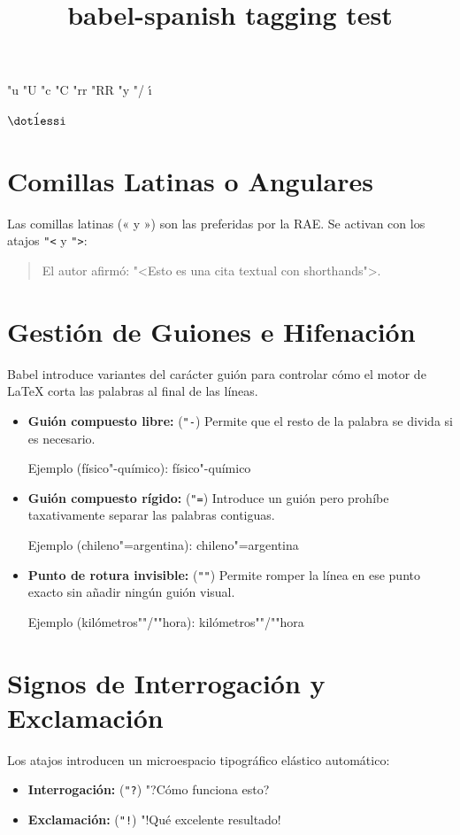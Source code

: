 \documentclass{article}
\title{babel-spanish tagging test}
\begin{document}
"u "U "c "C "rr "RR "y "/ \'{\i}

$\acute{\dotlessi}$

\section{Comillas Latinas o Angulares}
Las comillas latinas (« y ») son las preferidas por la RAE. Se activan con los
atajos \verb+"<+ y \verb+">+:

\begin{quotation}
El autor afirmó: "<Esto es una cita textual con shorthands">.
\end{quotation}

\section{Gestión de Guiones e Hifenación}
Babel introduce variantes del carácter guión para controlar cómo el motor de
\LaTeX{} corta las palabras al final de las líneas.

\begin{itemize}
    \item \textbf{Guión compuesto libre:}  (\verb+"-+) Permite que el resto
    de la palabra se divida si es necesario. \par
    Ejemplo (físico"-químico): físico"-químico

    \item \textbf{Guión compuesto rígido:} (\verb+"=+) Introduce un guión
    pero prohíbe taxativamente separar las palabras contiguas. \par
    Ejemplo (chileno"=argentina): chileno"=argentina

    \item \textbf{Punto de rotura invisible:} (\verb+""+) Permite romper la
    línea en ese punto exacto sin añadir ningún guión visual. \par
    Ejemplo (kilómetros""/""hora): kilómetros""/""hora
\end{itemize}

\section{Signos de Interrogación y Exclamación}
Los atajos introducen un microespacio tipográfico elástico automático:

\begin{itemize}
    \item \textbf{Interrogación:} (\verb+"?+) "?Cómo funciona esto?
    \item \textbf{Exclamación:} (\verb+"!+) "!Qué excelente resultado!
\end{itemize}
\end{document}
